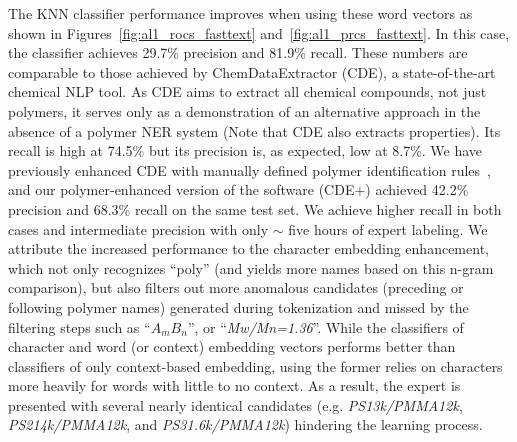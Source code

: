 The KNN classifier performance improves when using these word vectors as shown in Figures~\ref{fig:al1_rocs_fasttext} and~\ref{fig:al1_prcs_fasttext}.
In this case, the classifier achieves 29.7\% precision and 81.9\% recall. 
These numbers are comparable to those achieved by ChemDataExtractor (CDE), a state-of-the-art chemical NLP tool.
As CDE aims to extract all
chemical compounds, not just polymers, it serves only as a demonstration of an
alternative approach in the absence of a polymer NER system (Note that CDE also extracts properties). 
Its recall is high
at 74.5\% but its precision is, as expected, low at 8.7\%. 
We have previously enhanced CDE with
manually defined polymer identification rules~\cite{tchoua2017towards},
and our polymer-enhanced version of the software (CDE+) achieved 42.2\% precision and 68.3\% recall on the same test set. 
We achieve higher recall in both cases and intermediate precision with only $\sim$ five hours of expert labeling.
We attribute the increased performance to the character embedding enhancement, which not only recognizes ``poly'' (and yields more names based on this n-gram comparison), but also filters out more anomalous candidates (preceding or following polymer names) generated during tokenization and missed by the filtering steps such as ``\textit{$A_mB_n$}'', or ``\textit{Mw/Mn=1.36}''.  
While the classifiers of character and word (or context) embedding vectors performs better than classifiers of only context-based embedding, using the former relies on characters more heavily for words with little to no context.
As a result, the expert is presented with several nearly identical candidates (e.g. \textit{PS13k/PMMA12k}, \textit{PS214k/PMMA12k}, and \textit{PS31.6k/PMMA12k}) hindering the learning process.

